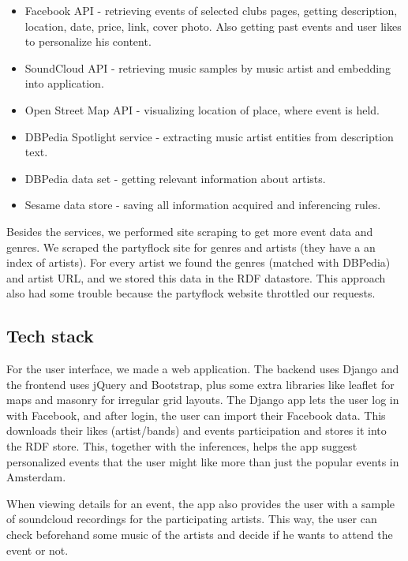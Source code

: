 \documentclass[12pt, a4paper, lithuanian]{article}
\begin{document}
\begin{itemize}

  \item Facebook API - retrieving events of selected clubs pages, getting description, location, date, price, link, cover photo. Also getting past events and user likes to personalize his content.

  \item SoundCloud API - retrieving music samples by music artist and embedding into application.

  \item Open Street Map API - visualizing location of place, where event is held.

  \item DBPedia Spotlight service - extracting music artist entities from description text.

  \item DBPedia data set - getting relevant information about artists.

  \item Sesame data store - saving all information acquired and inferencing rules.

\end{itemize}

Besides the services, we performed site scraping to get more event data and genres. We scraped the partyflock site for genres and artists (they have a an index of artists). For every artist we found the genres (matched with DBPedia) and artist URL, and we stored this data in the RDF datastore. This approach also had some trouble because the partyflock website throttled our requests.

\subsection{Tech stack}

For the user interface, we made a web application. The backend uses Django and the frontend uses jQuery and Bootstrap, plus some extra libraries like leaflet for maps and masonry for irregular grid layouts. The Django app lets the user log in with Facebook, and after login, the user can import their Facebook data. This downloads their likes (artist/bands) and events participation and stores it into the RDF store. This, together with the inferences, helps the app suggest personalized events that the user might like more than just the popular events in Amsterdam.

When viewing details for an event, the app also provides the user with a sample of soundcloud recordings for the participating artists. This way, the user can check beforehand some music of the artists and decide if he wants to attend the event or not.
\end{document}
